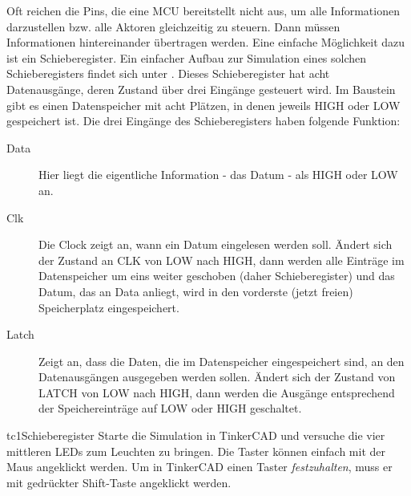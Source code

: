 \begin{multicols}{2}
Oft reichen die Pins, die eine MCU bereitstellt nicht aus, um alle Informationen darzustellen bzw. alle 
Aktoren gleichzeitig zu steuern. Dann müssen Informationen hintereinander übertragen werden. Eine einfache
Möglichkeit dazu ist ein Schieberegister. Ein einfacher Aufbau zur Simulation eines solchen Schieberegisters
findet sich unter .
\vfill\null\pagebreak
Dieses Schieberegister hat acht Datenausgänge, deren Zustand über drei Eingänge gesteuert wird.
Im Baustein gibt es einen Datenspeicher mit acht Plätzen, in denen jeweils HIGH oder LOW gespeichert ist.
Die drei Eingänge des Schieberegisters haben folgende Funktion:
\begin{description}
  \item[Data] Hier liegt die eigentliche Information - das Datum - als HIGH oder LOW an.
  \item[Clk] Die Clock zeigt an, wann ein Datum eingelesen werden soll. Ändert sich der Zustand an CLK von LOW nach HIGH, 
  dann werden alle Einträge im Datenspeicher um eins weiter geschoben (daher Schieberegister) und das Datum, das an Data anliegt, 
  wird in den vorderste (jetzt freien) Speicherplatz eingespeichert.
  \item[Latch] Zeigt an, dass die Daten, die im Datenspeicher eingespeichert sind, an den Datenausgängen ausgegeben werden
  sollen. Ändert sich der Zustand von LATCH von LOW nach HIGH, dann werden die Ausgänge entsprechend der Speichereinträge
  auf LOW oder HIGH geschaltet.
\end{description}

\begin{excercise}{tc1}{Schieberegister}
Starte die Simulation in TinkerCAD und versuche die vier mittleren LEDs zum Leuchten zu bringen. Die Taster können einfach 
mit der Maus angeklickt werden. Um in TinkerCAD einen Taster \textit{festzuhalten}, muss er mit gedrückter Shift-Taste 
angeklickt werden.
\end{excercise}


\vfill\null\pagebreak






\end{multicols}
